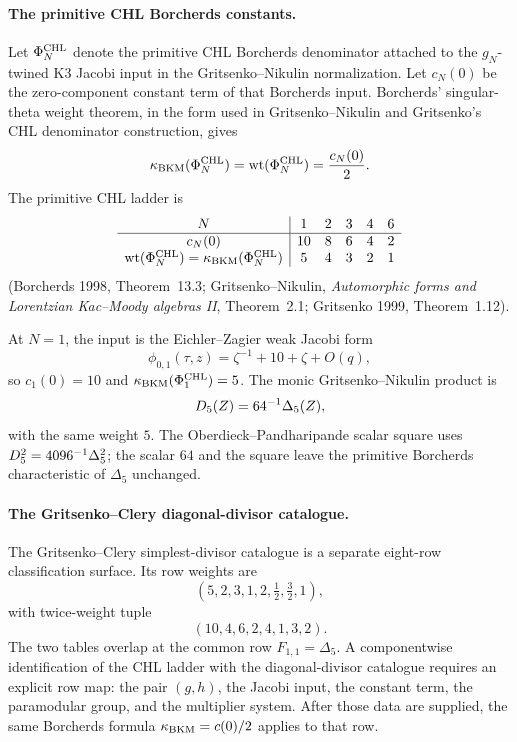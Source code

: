 \paragraph{The primitive CHL Borcherds constants.}
Let \(\Phi^{\mathrm{CHL}}_N\) denote the primitive CHL Borcherds denominator
attached to the \(g_N\)-twined K3 Jacobi input in the
Gritsenko--Nikulin normalization.  Let \(c_N(0)\) be the zero-component
constant term of that Borcherds input.  Borcherds' singular-theta
weight theorem, in the form used in Gritsenko--Nikulin and Gritsenko's
CHL denominator construction, gives
\[
  \kappa_{\mathrm{BKM}}(\Phi^{\mathrm{CHL}}_N)=\operatorname{wt}(\Phi^{\mathrm{CHL}}_N)=\frac{c_N(0)}{2}.
\]
The primitive CHL ladder is
\[
\begin{array}{c|ccccc}
N & 1 & 2 & 3 & 4 & 6\\ \hline
c_N(0) & 10 & 8 & 6 & 4 & 2\\
\operatorname{wt}(\Phi^{\mathrm{CHL}}_N)=\kappa_{\mathrm{BKM}}(\Phi^{\mathrm{CHL}}_N) & 5 & 4 & 3 & 2 & 1
\end{array}
\]
(Borcherds 1998, Theorem~13.3; Gritsenko--Nikulin,
\emph{Automorphic forms and Lorentzian Kac--Moody algebras II},
Theorem~2.1; Gritsenko 1999, Theorem~1.12).

At \(N=1\), the input is the Eichler--Zagier weak Jacobi form
\[
  \phi_{0,1}(\tau,z)=\zeta^{-1}+10+\zeta+O(q),
\]
so \(c_1(0)=10\) and \(\kappa_{\mathrm{BKM}}(\Phi^{\mathrm{CHL}}_1)=5\).  The monic
Gritsenko--Nikulin product is
\[
  D_5(Z)=64^{-1}\Delta_5(Z),
\]
with the same weight \(5\).  The Oberdieck--Pandharipande scalar square
uses \(D_5^2=4096^{-1}\Delta_5^2\); the scalar \(64\) and the square
leave the primitive Borcherds characteristic of \(\Delta_5\) unchanged.

\paragraph{The Gritsenko--Clery diagonal-divisor catalogue.}
The Gritsenko--Clery simplest-divisor catalogue is a separate
eight-row classification surface.  Its row weights are
\[
  (5,2,3,1,2,\tfrac12,\tfrac32,1),
\]
with twice-weight tuple
\[
  (10,4,6,2,4,1,3,2).
\]
The two tables overlap at the common row \(F_{1,1}=\Delta_5\).  A
componentwise identification of the CHL ladder with the diagonal-divisor
catalogue requires an explicit row map: the pair \((g,h)\), the Jacobi
input, the constant term, the paramodular group, and the multiplier
system.  After those data are supplied, the same Borcherds formula
\(\kappa_{\mathrm{BKM}}=c(0)/2\) applies to that row.

